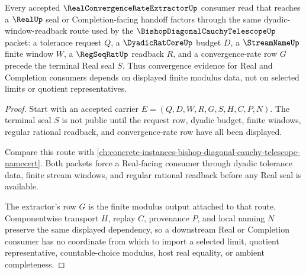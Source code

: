 \begin{theorem}
\label{thm:real-convergence-rate-extractor-cauchy-handoff}
Every accepted $\RealConvergenceRateExtractorUp$ consumer read that reaches a $\RealUp$ seal or Completion-facing handoff factors through the same dyadic-window-readback route used by the $\BishopDiagonalCauchyTelescopeUp$ packet: a tolerance request $Q$, a $\DyadicRatCoreUp$ budget $D$, a $\StreamNameUp$ finite window $W$, a $\RegSeqRatUp$ readback $R$, and a convergence-rate row $G$ precede the terminal Real seal $S$. Thus convergence evidence for Real and Completion consumers depends on displayed finite modulus data, not on selected limits or quotient representatives.
\end{theorem}
\begin{proof}
Start with an accepted carrier $E=(Q,D,W,R,G,S,H,C,P,N)$. The terminal seal $S$ is not public until the request row, dyadic budget, finite windows, regular rational readback, and convergence-rate row have all been displayed.

Compare this route with \autoref{ch:concrete-instances-bishop-diagonal-cauchy-telescope-namecert}. Both packets force a Real-facing consumer through dyadic tolerance data, finite stream windows, and regular rational readback before any Real seal is available.

The extractor's row $G$ is the finite modulus output attached to that route. Componentwise transport $H$, replay $C$, provenance $P$, and local naming $N$ preserve the same displayed dependency, so a downstream Real or Completion consumer has no coordinate from which to import a selected limit, quotient representative, countable-choice modulus, host real equality, or ambient completeness.
\end{proof}



